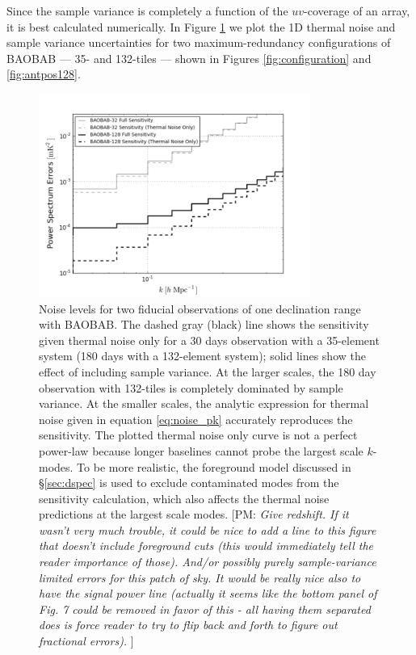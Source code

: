 \documentclass[10pt,iop]{emulateapj}
\def\pvm#1{[PM: {\it #1}] }
\begin{document}
Since the sample variance is completely a function of the $uv$-coverage of an array,
it is best calculated
numerically.  In Figure \ref{fig:sense_wwo_samp_var} we plot the 1D thermal noise and 
sample variance uncertainties for
two maximum-redundancy configurations of BAOBAB --- 35- and 132-tiles ---
shown in Figures \ref{fig:configuration} and \ref{fig:antpos128}.
\begin{figure}\centering
\includegraphics[width=3.5in]{sense_wwo_samp_var-3.png}
\caption{Noise levels for two fiducial observations of one declination range 
with BAOBAB.  
The dashed gray (black) line shows
the sensitivity given thermal noise only for a 30 days observation with a 
35-element system
(180 days with a 132-element system); 
solid lines show the effect of including sample variance.  
At the larger scales, the 180 day observation with 132-tiles is completely 
dominated by sample
variance.
At the smaller scales, the analytic expression for thermal noise
given in equation \ref{eq:noise_pk} accurately reproduces the sensitivity.  
The plotted thermal noise
only curve is not a perfect power-law because longer baselines cannot probe the largest scale
$k$-modes.  To be more realistic, the foreground model discussed in \S\ref{sec:dspec}
is used to exclude contaminated modes from the sensitivity calculation, which also affects
the thermal noise predictions at the largest scale modes.
\pvm{Give redshift. If it wasn't very much trouble, it could be nice to add 
a line to this figure that doesn't include foreground cuts (this would 
immediately tell the reader importance of those). And/or possibly purely 
sample-variance limited errors for this patch of sky. It would be really nice
also to have the signal power line (actually it seems like the bottom panel
of Fig. 7 could be removed in favor of this - all having them separated does
is force reader to try to flip back and forth to figure out fractional errors). }
} \label{fig:sense_wwo_samp_var}
\end{figure}  
\end{document}
